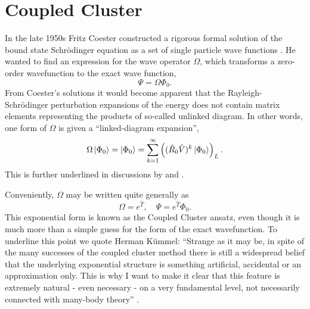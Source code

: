 \chapter{Coupled Cluster}
\label{ch:coupled_cluster_theory}

In the late 1950s Fritz Coester constructed a rigorous formal solution of the bound
state Schrödinger equation as a set of single particle wave
functions \cite{coester1958bound}. He wanted to find an expression for the wave operator 
$\Omega$, which transforms a zero-order wavefunction to the exact wave function,
\begin{equation}
    \Psi = \Omega \Phi_0.
\end{equation}
From Coester's solutions it would become apparent that the Rayleigh-Schrödinger 
perturbation expansions of the energy does not contain matrix elements representing 
the products of so-called unlinked diagram. In other words, one form of $\Omega$ is 
given a ``linked-diagram expansion'',
\begin{equation}
    \Omega\ket{\Phi_0} = \ket{\Phi_0} 
    = \sum_{k=1}^\infty\left((\hat{R}_0\hat{V})^k \ket{{\Phi_0}} \right)_L.
\end{equation}
This is further underlined in discussions by
\citeauthor{hubbard1957description} \cite{hubbard1957description}
and
\citeauthor{hubbard1957description} \cite{hugenholtz1957perturbation}.

Conveniently, $\Omega$ may be written quite generally as
\begin{equation}
    \Omega = e^{\hat{T}}, \quad \Psi = e^{\hat{T}}\Phi_0.
\end{equation}
This exponential form is known as the Coupled Cluster ansatz, even 
though it is much more than a simple guess for the form of the exact wavefunction.
To underline this point we quote Herman Kümmel: ``Strange as it may be, in spite of
the many successes of the coupled cluster method there is still a widespread belief
that the underlying exponential structure is something artificial, accidental or 
an approximation only. This is why I want to make it clear that this feature is 
extremely natural - even necessary - on a very fundamental level, not necessarily
connected with many-body theory'' \cite{kummel1991origins}. 

